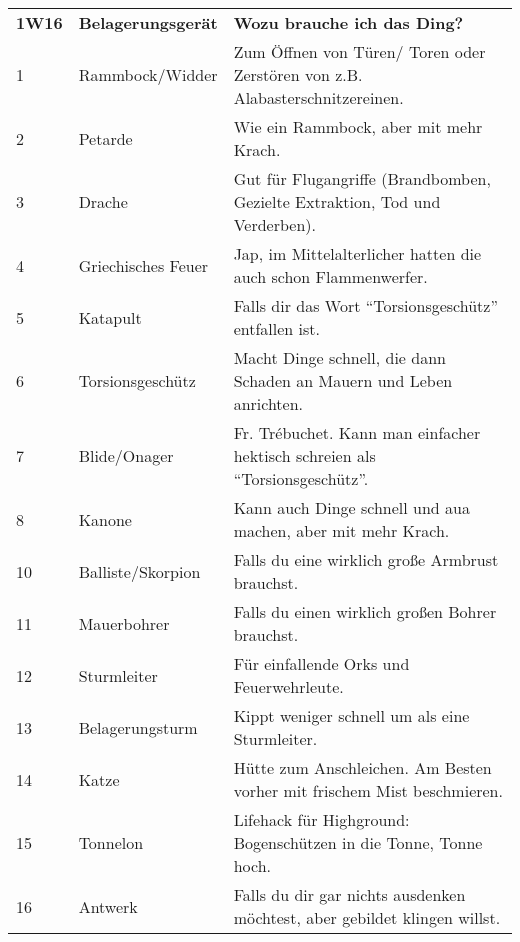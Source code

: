 \documentclass[final]{multiversum}
\begin{document}
\begin{table*}[!t]
      \begin{framed}
      \begin{tabular}{p{}p{}p{}}
      \textbf{1W16} & \textbf{Belagerungsgerät} & \textbf{Wozu brauche ich das Ding?}\\
      1             & Rammbock/Widder           & Zum Öffnen von Türen/ Toren oder Zerstören von z.B. Alabasterschnitzereinen. \\
      2             & Petarde                   & Wie ein Rammbock, aber mit mehr Krach.\\
      3             & Drache                    & Gut für Flugangriffe (Brandbomben, Gezielte Extraktion, Tod und Verderben).\\
      4             & Griechisches Feuer        & Jap, im Mittelalterlicher hatten die auch schon Flammenwerfer.\\
      5             & Katapult                  & Falls dir das Wort \enquote{Torsionsgeschütz} entfallen ist.\\
      6             & Torsionsgeschütz          & Macht Dinge schnell, die dann Schaden an Mauern und Leben anrichten.\\
      7             & Blide/Onager              & Fr. Trébuchet. Kann man einfacher hektisch schreien als \enquote{Torsionsgeschütz}.\\
      8             & Kanone                    & Kann auch Dinge schnell und aua machen, aber mit mehr Krach.\\
      10            & Balliste/Skorpion         & Falls du eine wirklich große Armbrust brauchst.\\
      11            & Mauerbohrer               & Falls du einen wirklich großen Bohrer brauchst.\\
      12            & Sturmleiter               & Für einfallende Orks und Feuerwehrleute.\\
      13            & Belagerungsturm           & Kippt weniger schnell um als eine Sturmleiter.\\
      14            & Katze                     & Hütte zum Anschleichen. Am Besten vorher mit frischem Mist beschmieren.\\
      15            & Tonnelon                  & Lifehack für Highground: Bogenschützen in die Tonne, Tonne hoch.\\
      16            & Antwerk                   & Falls du dir gar nichts ausdenken möchtest, aber gebildet klingen willst.\\

      \end{tabular}
      \end{framed}
      \end{table*}
\end{document}

